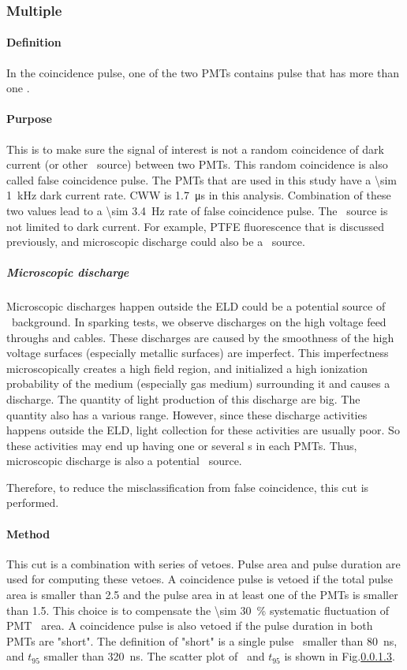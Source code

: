 \subsubsection{Multiple \sphe }

\paragraph{Definition}
In the coincidence pulse, one of the two PMTs contains pulse that has more than one \sphe .

\paragraph{Purpose}
This is to make sure the signal of interest is not a random coincidence of dark current (or other \sphe\ source) between two PMTs. 
This random coincidence is also called false coincidence pulse. 
The PMTs that are used in this study have a \SI{\sim 1}{\kHz} dark current rate. 
CWW is \SI{1.7}{\us} in this analysis. 
Combination of these two values lead to a \SI{\sim 3.4}{\Hz} rate of false coincidence pulse. 
The \sphe\ source is not limited to dark current. 
For example, PTFE fluorescence that is discussed previously, and microscopic discharge could also be a \sphe\ source. 

\subparagraph{Microscopic discharge}\label{sec:microdischarge} Microscopic discharges happen outside the ELD could be a potential source of \sphe\ background.  
In sparking tests, we observe discharges on the high voltage feed throughs and cables. 
These discharges are caused by the smoothness of the high voltage surfaces (especially metallic surfaces) are imperfect. 
This imperfectness microscopically creates a high field region, and initialized a high ionization probability of the medium (especially gas medium) surrounding it and causes a discharge. The quantity of light production of this discharge are big. 
The quantity also has a various range. 
However, since these discharge activities happens outside the ELD, light collection for these activities are usually poor. 
So these activities may end up having one or several \sphe s in each PMTs. 
Thus, microscopic discharge is also a potential \sphe\ source. 

Therefore, to reduce the misclassification from false coincidence, this cut is performed. 

\paragraph{Method}
This cut is a combination with series of vetoes.
Pulse area and pulse duration are used for computing these vetoes.
A coincidence pulse is vetoed if the total pulse area is smaller than \SI{2.5}{\phe} and the pulse area in at least one of the PMTs is smaller than \SI{1.5}{\phe}. 
This choice is to compensate the \SI{\sim 30}{\percent} systematic fluctuation of PMT \sphe\ area. 
A coincidence pulse is also vetoed if the pulse duration in both PMTs are "short". The definition of "short" is a single pulse \ttwoseven\ smaller than \SI{80}{\ns}, and  $t_{95}$ smaller than \SI{320}{\ns}. The scatter plot of \ttwoseven\ and $t_{95}$ is shown in Fig.\ref{}.

